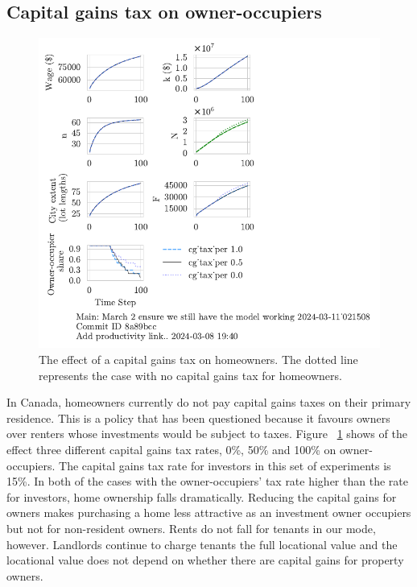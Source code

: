 \subsection{Capital gains tax on owner-occupiers}

\begin{figure}[h!b]
    \centering
    \includegraphics[scale=1.2, trim={0 1.4cm 0 0},clip]{fig/cg_tax_per-Main-021508.pdf}
    \caption{The effect of a capital gains tax on homeowners. The dotted line represents the case with no capital gains tax for homeowners.}
    \label{fig:CGpers_ownership_trajectory}
\end{figure}

In Canada, homeowners currently do not pay capital gains taxes on their primary residence. This is a policy that has been questioned because it favours owners over renters whose investments would be subject to taxes. Figure ~\ref{fig:CGpers_ownership_trajectory} shows of the effect three different  capital gains tax rates, 0\%, 50\% and 100\% on owner-occupiers. The capital gains tax rate for investors in this set of experiments is 15\%. In both of the cases with  the owner-occupiers' tax rate  higher than the rate for investors, %
home ownership falls dramatically. Reducing the capital gains for owners makes purchasing a home less attractive as an investment owner occupiers but not for non-resident owners. Rents do not fall for tenants in our mode, however. Landlords continue to charge tenants the full locational value and the locational value does not depend on whether there are capital gains for property owners. 

